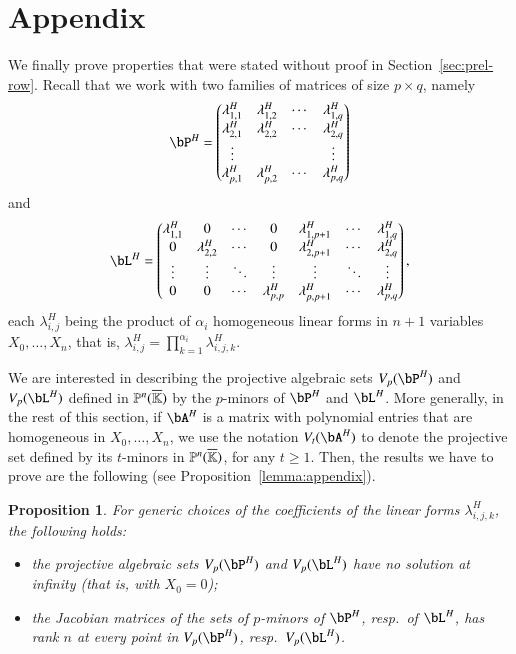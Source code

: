 \documentclass[amsthm]{elsart}
\newtheorem*{propositionnonumber}{Proposition}
\begin{document}
\section{Appendix}\label{appendix}

We finally prove properties that were stated without proof in
Section~\ref{sec:prel-row}.  Recall that we work with two families of
matrices of size $p \times q$, namely
\begin{align}\label{eqdef:type2b}
\bP^H= \left( \begin{matrix}
\lambda^H_{1,1} & \lambda^H_{1,2} & \cdots & \lambda^H_{1, q}\\
 \lambda^H_{2,1} &  \lambda^H_{2,2} & \cdots & \lambda^H_{2, q}\\
 \vdots & & & \vdots\\
 \lambda^H_{p,1} &  \lambda^H_{p,2}& \cdots & \lambda^H_{p, q}
\end{matrix} \right)
\end{align}
and
\begin{align}\label{eqdef:type1b}
\bL^H= \left( \begin{matrix}
\lambda^H_{1,1} & 0 & \cdots & 0 & \lambda^H_{1,p+1} & \cdots & \lambda^H_{1, q}\\
0 & \lambda^H_{2,2} & \cdots & 0 & \lambda^H_{2,p+1} & \cdots & \lambda^H_{2, q}\\
\vdots & \vdots & \ddots & \vdots & \vdots & \ddots & \vdots\\
0 & 0 & \cdots & \lambda^H_{p,p} & \lambda^H_{p,p+1} & \cdots & \lambda^H_{p, q}
\end{matrix} \right),
\end{align}
each $\lambda^H_{i,j}$ being the product of $\alpha_i$ homogeneous
linear forms in $n+1$ variables $X_0,\dots,X_n$, that is,
$\lambda^H_{i,j}=\prod_{k=1}^{\alpha_i} \lambda^H_{i,j,k}$.

We are interested in describing the projective algebraic sets
$V_p(\bP^H)$ and $V_p(\bL^H)$ defined in $\mathbb{P}^n(\overline{\mathbb{K}})$ by the
$p$-minors of $\bP^H$ and $\bL^H$. More generally, in the rest of this
section, if $\bA^H$ is a matrix with polynomial entries that are
homogeneous in $X_0,\dots,X_n$, we use the notation $V_t(\bA^H)$ to
denote the projective set defined by its $t$-minors in $\mathbb{P}^n(\overline{\mathbb{K}})$,
for any $t\ge 1$. Then, the results we have to prove are the following
(see Proposition~\ref{lemma:appendix}).
\begin{propositionnonumber}\label{lemma:appendix2}
  For generic choices of the coefficients of the linear forms
  $\lambda^H_{i,j,k}$, the following holds:
  \begin{itemize}
  \item the projective algebraic sets $V_p(\bP^H)$ and $V_p(\bL^H)$
    have no solution at infinity (that is, with $X_0=0$);
  \item the Jacobian matrices of the sets of $p$-minors 
    of $\bP^H$, resp.\ of $\bL^H$, has rank $n$ at every point 
    in $V_p(\bP^H)$, resp.\ $V_p(\bL^H)$.
\end{itemize}
\end{propositionnonumber}
\end{document}
